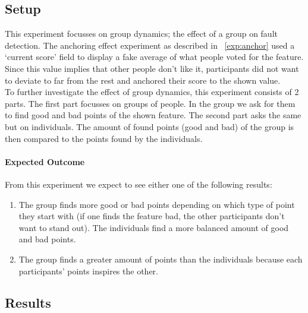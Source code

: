 \documentclass[main.tex]{subfiles}
\begin{document}
\subsection{Setup}
This experiment focusses on group dynamics; the effect of a group on fault detection. The anchoring effect experiment as described in ~\ref{exp:anchor} used a `current score' field to display a fake average of what people voted for the feature. Since this value implies that other people don't like it, participants did not want to deviate to far from the rest and anchored their score to the shown value. \\
To further investigate the effect of group dynamics, this experiment consists of 2 parts. The first part focusses on groups of people. In the group we ask for them to find good and bad points of the shown feature. The second part asks the same but on individuals. The amount of found points (good and bad) of the group is then compared to the points found by the individuals.

\paragraph{Expected Outcome}
From this experiment we expect to see either one of the following results:
\begin{enumerate}
\item The group finds more good or bad points depending on which type of point they start with (if one finds the feature bad, the other participants don't want to stand out). The individuals find a more balanced amount of good and bad points.
\item The group finds a greater amount of points than the individuals because each participants' points inspires the other.
\end{enumerate}

\subsection{Results}
\end{document}
